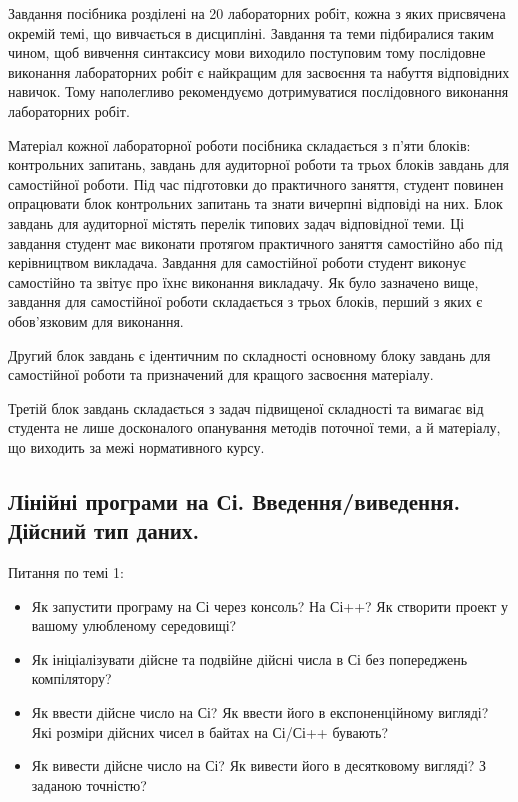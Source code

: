\documentclass[]{article}
\begin{document}
Завдання посібника розділені на 20 лабораторних робіт, кожна з яких
присвячена окремій темі, що вивчається в дисципліні. Завдання та теми
підбиралися таким чином, щоб вивчення синтаксису мови виходило
поступовим тому послідовне виконання лабораторних робіт є найкращим для
засвоєння та набуття відповідних навичок. Тому наполегливо рекомендуємо
дотримуватися послідовного виконання лабораторних робіт.

Матеріал кожної лабораторної роботи посібника складається з п'яти
блоків: контрольних запитань, завдань для аудиторної роботи та трьох
блоків завдань для самостійної роботи. Під час підготовки до практичного
заняття, студент повинен опрацювати блок контрольних запитань та знати
вичерпні відповіді на них. Блок завдань для аудиторної містять перелік
типових задач відповідної теми. Ці завдання студент має виконати
протягом практичного заняття самостійно або під керівництвом викладача.
Завдання для самостійної роботи студент виконує самостійно та звітує про
їхнє виконання викладачу. Як було зазначено вище, завдання для
самостійної роботи складається з трьох блоків, перший з яких є
обов'язковим для виконання.

Другий блок завдань є ідентичним по складності основному блоку завдань
для самостійної роботи та призначений для кращого засвоєння матеріалу.

Третій блок завдань складається з задач підвищеної складності та вимагає
від студента не лише досконалого опанування методів поточної теми, а й
матеріалу, що виходить за межі нормативного курсу.


\newpage
\subsection{ Лінійні програми на Сі. Введення/виведення. Дійсний тип даних. }
\setcounter{subsection}{1}

Питання по темі 1:

\begin{itemize}
\item
Як запустити програму на Сі через консоль? На Сі++? Як створити
проект у вашому улюбленому середовищі?
\item
Як ініціалізувати дійсне та подвійне дійсні числа в Сі без попереджень 
компілятору? 
\item
Як ввести дійсне число на Сі? Як ввести його в
експоненційному вигляді? Які розміри дійсних чисел в байтах на Сі/Сі++
бувають?

\item
Як вивести дійсне число на Сі? Як вивести його в десятковому вигляді?
З заданою точністю?
\end{itemize}
\end{document}
